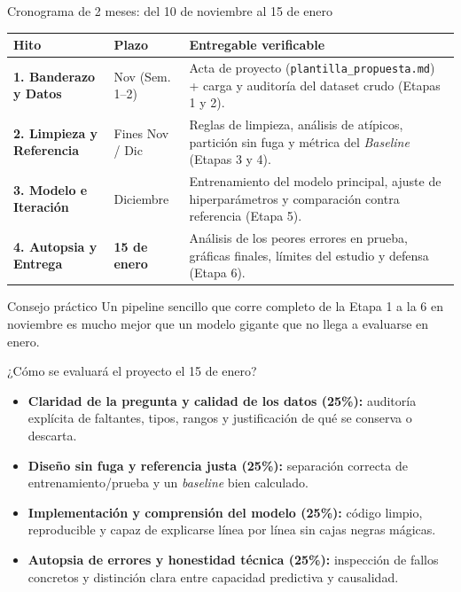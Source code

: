 \documentclass[aspectratio=169,11pt]{beamer}
\begin{document}
\begin{frame}{Cronograma de 2 meses: del 10 de noviembre al 15 de enero}
  \begin{center}
    \scriptsize
    \begin{tabular}{llp{7.6cm}}
      \toprule
      \textbf{Hito} & \textbf{Plazo} & \textbf{Entregable verificable} \\
      \midrule
      \textbf{1. Banderazo y Datos} & Nov (Sem. 1--2) & Acta de proyecto (\texttt{plantilla\_propuesta.md}) + carga y auditoría del dataset crudo (Etapas 1 y 2). \\
      \addlinespace[3pt]
      \textbf{2. Limpieza y Referencia} & Fines Nov / Dic & Reglas de limpieza, análisis de atípicos, partición sin fuga y métrica del \emph{Baseline} (Etapas 3 y 4). \\
      \addlinespace[3pt]
      \textbf{3. Modelo e Iteración} & Diciembre & Entrenamiento del modelo principal, ajuste de hiperparámetros y comparación contra referencia (Etapa 5). \\
      \addlinespace[3pt]
      \textbf{4. Autopsia y Entrega} & \textbf{15 de enero} & Análisis de los peores errores en prueba, gráficas finales, límites del estudio y defensa (Etapa 6). \\
      \bottomrule
    \end{tabular}
  \end{center}
  \vspace{0.15cm}
  \begin{block}{Consejo práctico}
    \small Un pipeline sencillo que corre completo de la Etapa 1 a la 6 en noviembre es mucho mejor que un modelo gigante que no llega a evaluarse en enero.
  \end{block}
\end{frame}

\begin{frame}{¿Cómo se evaluará el proyecto el 15 de enero?}
  \begin{itemize}
    \item \textbf{Claridad de la pregunta y calidad de los datos (25\%):} auditoría explícita de faltantes, tipos, rangos y justificación de qué se conserva o descarta.
    \item \textbf{Diseño sin fuga y referencia justa (25\%):} separación correcta de entrenamiento/prueba y un \emph{baseline} bien calculado.
    \item \textbf{Implementación y comprensión del modelo (25\%):} código limpio, reproducible y capaz de explicarse línea por línea sin cajas negras mágicas.
    \item \textbf{Autopsia de errores y honestidad técnica (25\%):} inspección de fallos concretos y distinción clara entre capacidad predictiva y causalidad.
  \end{itemize}
\end{frame}
\end{document}

